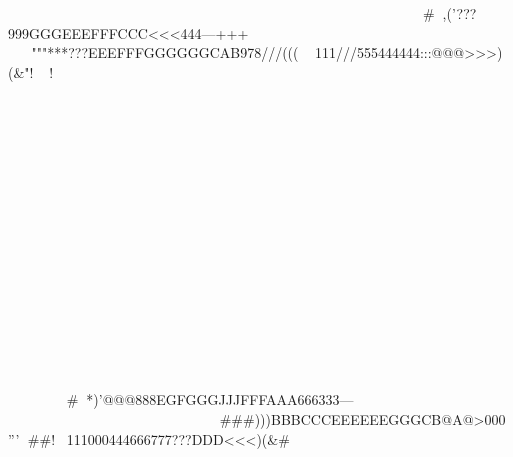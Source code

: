 

		

						





#,('???999GGGEEEFFFCCC<<<444---+++			                                                                                                         			"""***???EEEFFFGGGGGGCAB978///(((   111///555444444:::@@@>>>)(&"!!

	


			
	

	

































		

				
	
	


	

#*)'@@@888EGFGGGJJJFFFAAA666333---			                                                                                                            ###)))BBBCCCEEEEEEGGGCB@A@>000'''  ##!111000444666777???DDD<<<)(&#






						







	











				










				
	
	


